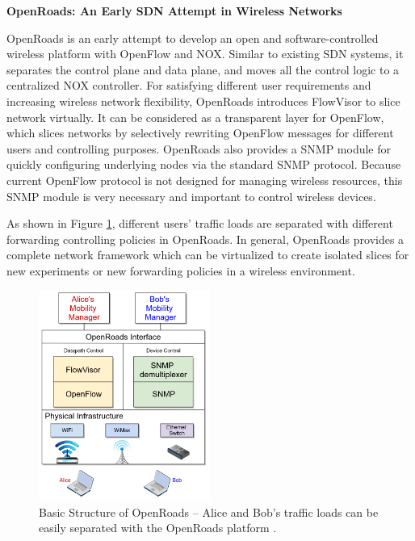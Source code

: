 \documentclass[english]{tktltiki}
\begin{document}
\vspace{1mm}

\textbf{OpenRoads: An Early SDN Attempt in Wireless Networks}

\vspace{1mm}

OpenRoads \cite{ysk+10} is an early attempt to develop an open and software-controlled wireless platform with OpenFlow and NOX. Similar to existing SDN systems, it separates the control plane and data plane, and moves all the control logic to a centralized NOX controller. For satisfying different user requirements and increasing wireless network flexibility, OpenRoads introduces FlowVisor to slice network virtually. It can be considered as a transparent layer for OpenFlow, which slices networks by selectively rewriting OpenFlow messages for different users and controlling purposes. OpenRoads also provides a SNMP module for quickly configuring underlying nodes via the standard SNMP protocol. Because current OpenFlow protocol is not designed for managing wireless resources, this SNMP module is very necessary and important to control wireless devices.

As shown in Figure \ref{fig:openroads}, different users' traffic loads are separated with different forwarding controlling policies in OpenRoads. In general, OpenRoads provides a complete network framework which can be virtualized to create isolated slices for new experiments or new forwarding policies in a wireless environment.

\begin{figure}[htbp]
  \centering
  \includegraphics[width=0.5\textwidth]{images/openroads.png}
  \caption{Basic Structure of OpenRoads -- Alice and Bob's traffic loads can be easily separated with the OpenRoads platform \cite{ysk+10}.}
  \label{fig:openroads}
\end{figure}
\end{document}

